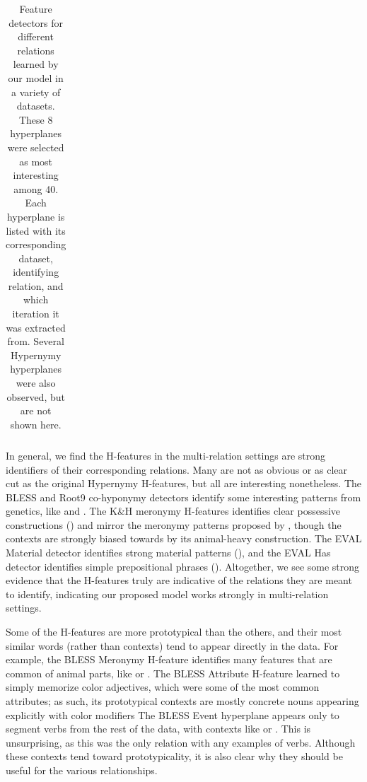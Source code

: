 \begin{table}[t]
\begin{small}
\begin{tabular}{|ll|}
\hline
\end{tabular}
\end{small}
\caption{Feature detectors for different relations learned by our model in a
  variety of datasets. These 8 hyperplanes were selected as most interesting
  among 40. Each hyperplane is listed with its corresponding dataset,
  identifying relation, and which iteration it was extracted from. Several
  Hypernymy hyperplanes were also observed, but are not shown here.}
\label{tab:ctxsimmulti}
\end{table}

In general, we find the H-features in the multi-relation settings are strong
identifiers of their corresponding relations. Many are not as obvious or as
clear cut as the original Hypernymy H-features, but all are interesting
nonetheless. The BLESS and Root9 co-hyponymy detectors identify some
interesting patterns from genetics, like  and . The K\&H meronymy H-features
identifies clear possessive constructions () and mirror
the meronymy patterns proposed by , though
the contexts are strongly biased towards by its animal-heavy construction.
The EVAL Material detector identifies strong material patterns
(), and the EVAL Has detector
identifies simple prepositional phrases ().
Altogether, we see some strong evidence that the H-features truly are
indicative of the relations they are meant to identify, indicating our
proposed model works strongly in multi-relation settings.

Some of the H-features are more prototypical than the others, and their
most similar words (rather than contexts) tend to appear directly in the data.
For example, the BLESS Meronymy H-feature identifies many features that are
common of animal parts, like  or .
The BLESS Attribute H-feature learned to simply memorize color adjectives, which
were some of the most common attributes; as such, its prototypical contexts are
mostly concrete nouns appearing explicitly with color modifiers
The BLESS
Event hyperplane appears only to segment verbs from the rest of the data,
with contexts like  or . This is
unsurprising, as this was the only relation with any examples of verbs.
Although these contexts tend toward prototypicality, it is also clear why
they should be useful for the various relationships.

